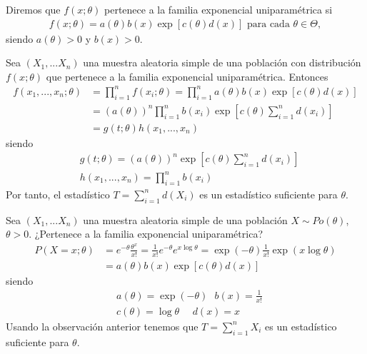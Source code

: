\begin{defi}
    Diremos que $f(x;\theta)$ pertenece a la familia exponencial uniparamétrica si
    \begin{align*}
        f(x;\theta) = a(\theta)b(x)\exp[c(\theta)d(x)] \text{ para cada } \theta \in \Theta,
    \end{align*}
    siendo $a(\theta) > 0$ y $b(x) > 0$.
\end{defi}

\begin{obs}
    Sea $(X_1,...X_n)$ una muestra aleatoria simple de una población con distribución $f(x;\theta)$ que pertenece a la familia exponencial uniparamétrica. Entonces
    \begin{align*}
        f(x_1,...,x_n;\theta) & = \prod_{i=1}^{n}{f(x_i;\theta)} = \prod_{i=1}^{n}{a(\theta)b(x)\exp[c(\theta)d(x)]}    \\
                              & = (a(\theta))^n\prod_{i=1}^{n}{b(x_i)}\exp\left[c(\theta)\sum_{i=1}^{n}{d(x_i)} \right] \\
                              & = g(t;\theta)h(x_1,...,x_n)
    \end{align*}
    siendo
    \begin{align*}
         & g(t;\theta) =  (a(\theta))^n\exp\left[c(\theta)\sum_{i=1}^{n}{d(x_i)} \right] \\
         & h(x_1,...,x_n) = \prod_{i=1}^{n}{b(x_i)}
    \end{align*}
    Por tanto, el estadístico $T = \sum_{i=1}^{n}{d(X_i)}$ es un estadístico suficiente para $\theta$.
\end{obs}

\begin{ejemplo}
    Sea $(X_1,...X_n)$ una muestra aleatoria simple de una población $X \sim Po(\theta)$, $\theta > 0$. ¿Pertenece a la familia exponencial uniparamétrica?
    \begin{align*}
        P(X = x; \theta) & = e^{-\theta}\frac{\theta^x}{x!} = \frac{1}{x!}e^{-\theta}e^{x\log\theta} = \exp(-\theta)\frac{1}{x!}\exp(x\log\theta) \\
                         & = a(\theta)b(x)\exp[c(\theta)d(x)]
    \end{align*}
    siendo
    \begin{align*}
         & a(\theta) = \exp(-\theta) \ \ \ b(x) = \frac{1}{x!} \\
         & c(\theta) = \log\theta \ \ \ \ \ \ d(x) = x
    \end{align*}
    Usando la observación anterior tenemos que $T = \sum_{i=1}^{n}{X_i}$ es un estadístico suficiente para $\theta$.
\end{ejemplo}

